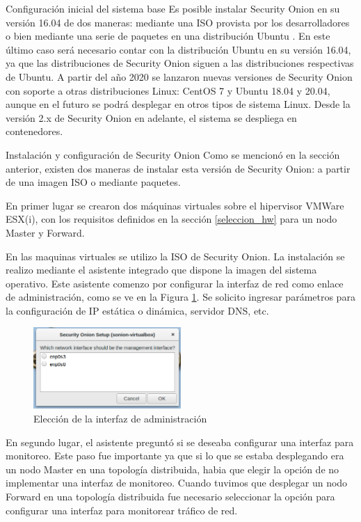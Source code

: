     \begin{section}{Configuración inicial del sistema base}
        Es posible instalar Security Onion en su versión 16.04 de dos maneras: mediante una ISO provista por los desarrolladores o bien mediante una serie de paquetes en una distribución Ubuntu \cite{ubuntu}. En este último caso será necesario contar con la distribución Ubuntu en su versión 16.04, ya que las distribuciones de Security Onion siguen a las distribuciones respectivas de Ubuntu. A partir del año 2020 se lanzaron nuevas versiones de Security Onion con soporte a otras distribuciones Linux: CentOS 7 y Ubuntu 18.04 y 20.04, aunque en el futuro se podrá desplegar en otros tipos de sistema Linux. Desde la versión 2.x de Security Onion en adelante, el sistema se despliega en contenedores.
        \begin{subsection}{Instalación y configuración de Security Onion}
        Como se mencionó en la sección anterior, existen dos maneras de instalar esta versión de Security Onion: a partir de una imagen ISO o mediante paquetes. \par 
        En primer lugar se crearon dos máquinas virtuales sobre el hipervisor VMWare ESX(i), con los requisitos definidos en la sección \ref{seleccion_hw} para un nodo Master y Forward.\par
        En las maquinas virtuales se utilizo la ISO de Security Onion. La instalación se realizo mediante el asistente integrado que dispone la imagen del sistema operativo. Este asistente comenzo por configurar la interfaz de red como enlace de administración, como se ve en la Figura \ref{fig:figura_37_sonion_conf}. Se solicito ingresar parámetros para la configuración de IP estática o dinámica, servidor DNS, etc. \par
        \begin{figure}[H]
            \centering
            \includegraphics[width=0.5\textwidth]{./iteracion_1_imagenes/figura_37_sonion_conf.png}
            \caption{Elección de la interfaz de administración}
            \label{fig:figura_37_sonion_conf}
        \end{figure}
        \FloatBarrier
        En segundo lugar, el asistente preguntó si se deseaba configurar una interfaz para monitoreo. Este paso fue importante ya que si lo que se estaba desplegando era un nodo Master en una topología distribuida, habia que elegir la opción de no implementar una interfaz de monitoreo. Cuando tuvimos que desplegar un nodo Forward en una topología distribuida fue necesario seleccionar la opción para configurar una interfaz para monitorear tráfico de red. \par

\end{subsection}
\end{section}

